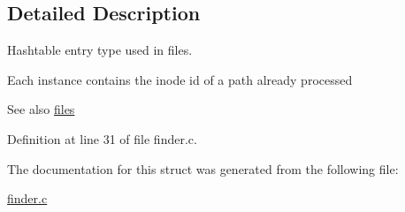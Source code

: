 \subsection{Detailed Description}
Hashtable entry type used in {\ttfamily files}. 

Each instance contains the inode id of a path already processed \begin{DoxySeeAlso}{See also}
\hyperlink{finder_8c_a8bb2e2bcd7c9c20c6bdf286c0c1b67e4}{files} 
\end{DoxySeeAlso}


Definition at line 31 of file finder.\+c.



The documentation for this struct was generated from the following file\+:\begin{DoxyCompactItemize}
\item 
\hyperlink{finder_8c}{finder.\+c}\end{DoxyCompactItemize}
